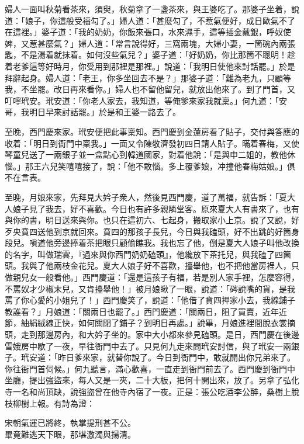 婦人一面叫秋菊看茶來，須臾，秋菊拿了一盞茶來，與王婆吃了。那婆子坐着，說道：「娘子，你這般受福勾了。」{}婦人道：「甚麼勾了，不惹氣便好，成日歐氣不了在這裡。」婆子道：「我的奶奶，你飯來張口，水來濕手，這等插金戴銀，呼奴使婢，又惹甚麼氣？」婦人道：「常言說得好，三窩兩塊，大婦小妻，一箇碗內兩張匙，不是湯着就抹着。如何沒些氣兒？」婆子道：「好奶奶，你比那箇不聰明！趁着老爹這等好時月，你受用到那裡是那裡。」說道：「我明日使他來討話罷。」於是拜辭起身。婦人道：「老王，你多坐回去不是？」那婆子道：「難為老九，只顧等我，不坐罷。改日再來看你。」婦人也不留他留兒，就放出他來了。到了門首，又叮嚀玳安。玳安道：「你老人家去，我知道，等俺爹來家我就稟。」何九道：「安哥，我明日早來討話罷。」於是和王婆一路去了。

至晚，西門慶來家。玳安便把此事稟知。西門慶到金蓮房看了貼子，交付與答應的收着：「明日到衙門中稟我。」一面又令陳敬濟發初四日請人貼子。瞞着春梅，又使琴童兒送了一兩銀子並一盒點心到韓道國家，對着他說：「是與申二姐的，教他休惱。」那王六兒笑嘻嘻接了，說：「他不敢惱。多上覆爹娘，冲撞他春梅姑娘。」俱不在言表。

至晚，月娘來家，先拜見大妗子衆人，然後見西門慶，道了萬福，就告訴：「夏大人娘子見了我去，好不喜歡。今日也有許多親隣堂客。原來夏大人有書來了，也有與你的書，明日送來與你。{}也只在這初六、七起身，搬取家小上京。說了又說，好歹央賁四送他到京就回來。賁四的那孩子長兒，今日與我磕頭，好不出跳的好箇身段兒。嗔道他旁邊捧着茶把眼只顧偷瞧我。我也忘了他，倒是夏大人娘子叫他改換的名字，叫做瑞雲，『過來與你西門奶奶磕頭』，他纔放下茶托兒，與我磕了四箇頭。我與了他兩枝金花兒。夏大人娘子好不喜歡，擡舉他，也不把他當房裡人，只做親兒女一般看他。」西門慶道：「還是這孩子有福，若是別人家手裡，怎麼容得，不罵奴才少椒末兒，又肯擡舉他！」{}被月娘瞅了一眼，說道：「硶說嘴的貨，是我罵了你心愛的小姐兒了！」西門慶笑了，說道：「他借了賁四押家小去，我線鋪子教誰看？」月娘道：「關兩日也罷了。」西門慶道：「關兩日，阻了買賣，近年近節，紬絹絨線正快，如何關閉了鋪子？到明日再處。」說畢，月娘進裡間脫衣裳摘頭，走到那邊房內，和大妗子坐的。家中大小都來參見磕頭。是日，西門慶在後邊雪娥房中歇了一夜，早往衙門中去了。只見何九走來問玳安討信，與了玳安一兩銀子。玳安道：「昨日爹來家，就替你說了。今日到衙門中，敢就開出你兄弟來了。你往衙門首伺候。」何九聽言，滿心歡喜，一直走到衙門前去了。西門慶到衙門中坐廳，提出強盜來，每人又是一夾，二十大板，把何十開出來，放了。另拿了弘化寺一名和尚頂缺，說強盜曾在他寺內宿了一夜。{}正是：張公吃酒李公醉，桑樹上脫枝柳樹上報。有詩為證：

\begin{myquote} 
宋朝氣運已將終，執掌提刑甚不公。\\畢竟難逃天下眼，那堪激濁與揚清。
\end{myquote} 

